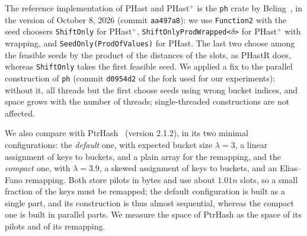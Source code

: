 \documentclass[11pt]{article}
\newcommand{\PHast}{PHast\xspace}
\newcommand{\PHastP}{PHast$^+$\xspace}
\newcommand{\PHastR}{PHastR\xspace}
\begin{document}
The reference implementation of \PHast and \PHastP is the \texttt{ph} crate
by Beling~\cite{BelBRLPFSDS}, in the version of October 8, 2026 (commit
\texttt{aa497a8}): we use
\texttt{Function2} with the seed choosers \texttt{ShiftOnly} for \PHastP,
\texttt{ShiftOnlyProdWrapped<$\delta$>} for \PHastP with wrapping, and
\texttt{SeedOnly(ProdOfValues)} for \PHast. The last two choose among the
feasible seeds by the product of the distances of the slots, as \PHastR does,
whereas \texttt{ShiftOnly} takes the first feasible seed. We applied a fix
to the parallel construction of \texttt{ph} (commit \texttt{d0954d2} of the
fork used for our experiments): without it, all threads but the first choose
seeds using wrong bucket indices, and space grows with the number of
threads; single-threaded constructions are not affected.

We also compare with PtrHash~\cite{RagPTR} (version 2.1.2), in its two
minimal configurations: the \emph{default} one, with expected bucket size
$\lambda=3$, a linear assignment of keys to buckets, and a plain array for
the remapping, and the \emph{compact} one, with $\lambda=3.9$, a skewed
assignment of keys to buckets, and an Elias--Fano remapping. Both store
pilots in bytes and use about $1.01n$ slots, so a small fraction of the keys
must be remapped; the default configuration is built as a single part, and
its construction is thus almost sequential, whereas the compact one is built
in parallel parts. We measure the space of PtrHash as the space of its
pilots and of its remapping.
\end{document}
